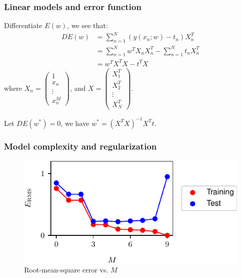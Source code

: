 \documentclass{beamer}
\begin{document}
\begin{frame}
    \frametitle{Linear models and error function}
    Differentiate $E(w)$, we see that:
    \begin{equation*}
        \begin{split}
            DE(w)&=\sum_{n=1}^{N}(y(x_{n};w)-t_{n})X_{n}^{T} \\
            &=\sum_{n=1}^{N}w^{T}X_{n}X_{n}^{T}-\sum_{n=1}^{N}t_{n}X_{n}^{T} \\
            &=w^{T}X^{T}X-t^{T}X
        \end{split}
    \end{equation*}
    where $X_{n}=\begin{pmatrix}
        1 \\
        x_{n} \\
        \vdots \\
        x_{n}^{M}
    \end{pmatrix}$, and $X=\begin{pmatrix}
        X_{1}^{T} \\
        X_{2}^{T} \\
        \vdots \\
        X_{N}^{T}
    \end{pmatrix}$.
    
    Let $DE(w^{*})=0$, we have $w^{*}=(X^{T}X)^{-1}X^{T}t$.
\end{frame}

\begin{frame}
    \frametitle{Model complexity and regularization}
    \begin{figure}
        \caption{Root-mean-square error vs. $M$}
        \includegraphics{Figure_7.pdf}
    \end{figure}
\end{frame}
\end{document}
